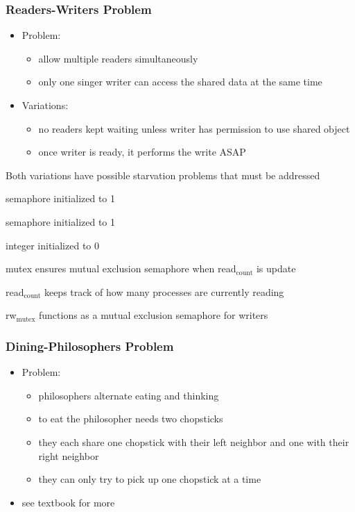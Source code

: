 \documentclass[11pt]{article}
\begin{document}
\subsubsection{Readers-Writers Problem}
\label{sec:org2d74081}
\begin{itemize}
\item Problem:
\begin{itemize}
\item allow multiple readers simultaneously
\item only one singer writer can access the shared data at the same time
\end{itemize}
\item Variations:
\begin{itemize}
\item no readers kept waiting unless writer has permission to use shared object
\item once writer is ready, it performs the write ASAP
\end{itemize}
\end{itemize}
Both variations have possible starvation problems that must be addressed

\begin{description}
\item[{rw\(_{\text{mutex}}\)}] semaphore initialized to 1
\item[{mutex}] semaphore initialized to 1
\item[{read\(_{\text{count}}\)}] integer initialized to 0

\item mutex ensures mutual exclusion semaphore when read\(_{\text{count}}\) is update
\item read\(_{\text{count}}\) keeps track of how many processes are currently reading
\item rw\(_{\text{mutex}}\) functions as a mutual exclusion semaphore for writers
\end{description}
\subsubsection{Dining-Philosophers Problem}
\label{sec:org653cdcf}
\begin{itemize}
\item Problem:
\begin{itemize}
\item philosophers alternate eating and thinking
\item to eat the philosopher needs two chopsticks
\item they each share one chopstick with their left neighbor and one with their right neighbor
\item they can only try to pick up one chopstick at a time
\end{itemize}
\item see textbook for more
\end{itemize}
\end{document}
